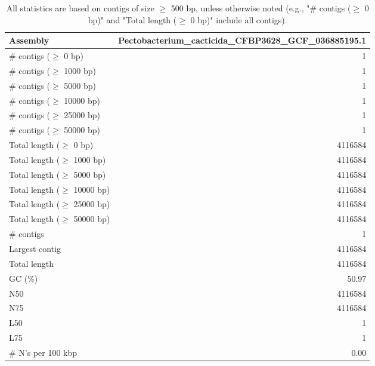 \documentclass[12pt,a4paper]{article}
\begin{document}
\begin{table}[ht]
\begin{center}
\caption{All statistics are based on contigs of size $\geq$ 500 bp, unless otherwise noted (e.g., "\# contigs ($\geq$ 0 bp)" and "Total length ($\geq$ 0 bp)" include all contigs).}
\begin{tabular}{|l*{1}{|r}|}
\hline
Assembly & Pectobacterium\_cacticida\_CFBP3628\_GCF\_036885195.1 \\ \hline
\# contigs ($\geq$ 0 bp) & 1 \\ \hline
\# contigs ($\geq$ 1000 bp) & 1 \\ \hline
\# contigs ($\geq$ 5000 bp) & 1 \\ \hline
\# contigs ($\geq$ 10000 bp) & 1 \\ \hline
\# contigs ($\geq$ 25000 bp) & 1 \\ \hline
\# contigs ($\geq$ 50000 bp) & 1 \\ \hline
Total length ($\geq$ 0 bp) & 4116584 \\ \hline
Total length ($\geq$ 1000 bp) & 4116584 \\ \hline
Total length ($\geq$ 5000 bp) & 4116584 \\ \hline
Total length ($\geq$ 10000 bp) & 4116584 \\ \hline
Total length ($\geq$ 25000 bp) & 4116584 \\ \hline
Total length ($\geq$ 50000 bp) & 4116584 \\ \hline
\# contigs & 1 \\ \hline
Largest contig & 4116584 \\ \hline
Total length & 4116584 \\ \hline
GC (\%) & 50.97 \\ \hline
N50 & 4116584 \\ \hline
N75 & 4116584 \\ \hline
L50 & 1 \\ \hline
L75 & 1 \\ \hline
\# N's per 100 kbp & 0.00 \\ \hline
\end{tabular}
\end{center}
\end{table}
\end{document}
